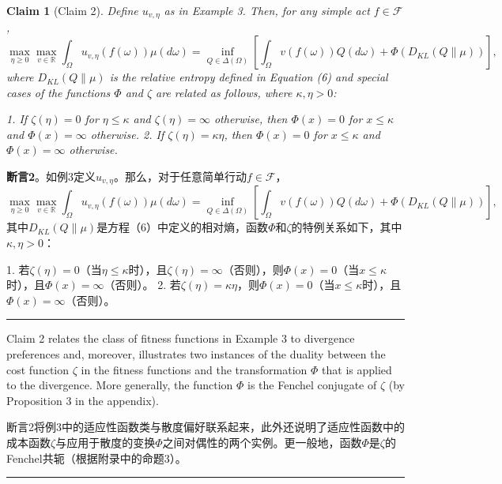 \documentclass[12pt,a4paper]{article}
\newenvironment{original}
  {\par\noindent\color{black}\smallskip}
  {\par\smallskip}
\newenvironment{translation}
  {\par\noindent\color{blue!70!black}\smallskip}
  {\par\medskip\hrule\medskip}
\newtheorem{claim}[theorem]{Claim}
\begin{document}
\begin{claim}[Claim 2]
Define $u_{v,\eta}$ as in Example 3. Then, for any simple act $f \in \mathcal{F}$,
\[
\max_{\eta \geq 0} \max_{v \in \mathbb{R}} \int_\Omega u_{v,\eta}(f(\omega)) \mu(d\omega) = \inf_{Q \in \Delta(\Omega)} \left[ \int_\Omega v(f(\omega)) Q(d\omega) + \Phi(D_{KL}(Q\|\mu)) \right],
\]
where $D_{KL}(Q\|\mu)$ is the relative entropy defined in Equation (6) and special cases of the functions $\Phi$ and $\zeta$ are related as follows, where $\kappa, \eta > 0$:

1. If $\zeta(\eta) = 0$ for $\eta \leq \kappa$ and $\zeta(\eta) = \infty$ otherwise, then $\Phi(x) = 0$ for $x \leq \kappa$ and $\Phi(x) = \infty$ otherwise.
2. If $\zeta(\eta) = \kappa \eta$, then $\Phi(x) = 0$ for $x \leq \kappa$ and $\Phi(x) = \infty$ otherwise.
\end{claim}
\begin{translation}
\textbf{断言2}。如例3定义$u_{v,\eta}$。那么，对于任意简单行动$f \in \mathcal{F}$，
\[
\max_{\eta \geq 0} \max_{v \in \mathbb{R}} \int_\Omega u_{v,\eta}(f(\omega)) \mu(d\omega) = \inf_{Q \in \Delta(\Omega)} \left[ \int_\Omega v(f(\omega)) Q(d\omega) + \Phi(D_{KL}(Q\|\mu)) \right],
\]
其中$D_{KL}(Q\|\mu)$是方程（6）中定义的相对熵，函数$\Phi$和$\zeta$的特例关系如下，其中$\kappa, \eta > 0$：

1. 若$\zeta(\eta) = 0$（当$\eta \leq \kappa$时），且$\zeta(\eta) = \infty$（否则），则$\Phi(x) = 0$（当$x \leq \kappa$时），且$\Phi(x) = \infty$（否则）。
2. 若$\zeta(\eta) = \kappa \eta$，则$\Phi(x) = 0$（当$x \leq \kappa$时），且$\Phi(x) = \infty$（否则）。
\end{translation}

\begin{original}
Claim 2 relates the class of fitness functions in Example 3 to divergence preferences and, moreover, illustrates two instances of the duality between the cost function $\zeta$ in the fitness functions and the transformation $\Phi$ that is applied to the divergence. More generally, the function $\Phi$ is the Fenchel conjugate of $\zeta$ (by Proposition 3 in the appendix).
\end{original}
\begin{translation}
断言2将例3中的适应性函数类与散度偏好联系起来，此外还说明了适应性函数中的成本函数$\zeta$与应用于散度的变换$\Phi$之间对偶性的两个实例。更一般地，函数$\Phi$是$\zeta$的Fenchel共轭（根据附录中的命题3）。
\end{translation}
\newpage
\end{document}
